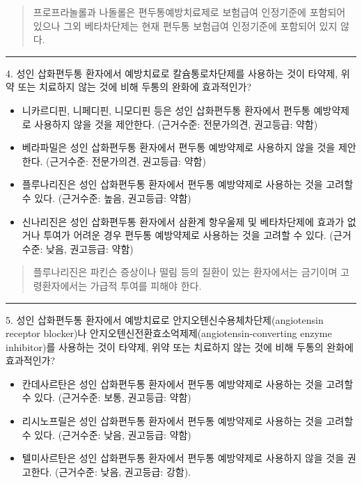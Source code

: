 \documentclass[]{book}
\begin{document}
\begin{quote}
프로프라놀롤과 나돌롤은 편두통예방치료제로 보험급여 인정기준에 포함되어 있으나 그외 베타차단제는 현재 편두통 보험급여 인정기준에 포함되어 있지 않다.
\end{quote}

\begin{center}\rule{0.5\linewidth}{\linethickness}\end{center}

4. 성인 삽화편두통 환자에서 예방치료로 칼슘통로차단제를 사용하는 것이 타약제, 위약 또는 치료하지 않는 것에 비해 두통의 완화에 효과적인가?

\begin{itemize}
\item
  니카르디핀, 니페디핀, 니모디핀 등은 성인 삽화편두통 환자에서 편두통 예방약제로 사용하지 않을 것을 제안한다. (근거수준: 전문가의견, 권고등급: 약함)
\item
  베라파밀은 성인 삽화편두통 환자에서 편두통 예방약제로 사용하지 않을 것을 제안한다. (근거수준: 전문가의견, 권고등급: 약함)
\item
  플루나리진은 성인 삽화편두통 환자에서 편두통 예방약제로 사용하는 것을 고려할 수 있다. (근거수준: 높음, 권고등급: 약함)
\item
  신나리진은 성인 삽화편두통 환자에서 삼환계 항우울제 및 베타차단제에 효과가 없거나 투여가 어려운 경우 편두통 예방약제로 사용하는 것을 고려할 수 있다. (근거수준: 낮음, 권고등급: 약함)
\end{itemize}

\begin{quote}
플루나리진은 파킨슨 증상이나 떨림 등의 질환이 있는 환자에서는 금기이며 고령환자에서는 가급적 투여를 피해야 한다.
\end{quote}

\begin{center}\rule{0.5\linewidth}{\linethickness}\end{center}

5. 성인 삽화편두통 환자에서 예방치료로 안지오텐신수용체차단제(angiotensin receptor blocker)나 안지오텐신전환효소억제제(angiotensin-converting enzyme inhibitor)를 사용하는 것이 타약제, 위약 또는 치료하지 않는 것에 비해 두통의 완화에 효과적인가?

\begin{itemize}
\item
  칸데사르탄은 성인 삽화편두통 환자에서 편두통 예방약제로 사용하는 것을 고려할 수 있다. (근거수준: 보통, 권고등급: 약함)
\item
  리시노프릴은 성인 삽화편두통 환자에서 편두통 예방약제로 사용하는 것을 고려할 수 있다. (근거수준: 낮음, 권고등급: 약함)
\item
  텔미사르탄은 성인 삽화편두통 환자에서 편두통 예방약제로 사용하지 않을 것을 권고한다. (근거수준: 낮음, 권고등급: 강함).
\end{itemize}
\end{document}
